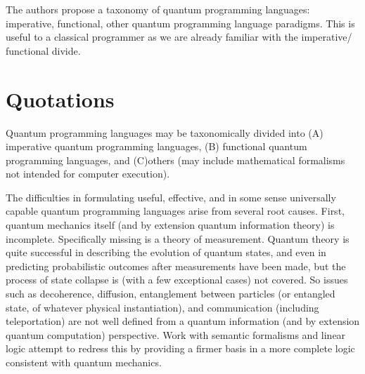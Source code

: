 \documentclass{article}
\begin{document}
The authors propose a taxonomy of quantum programming languages: imperative, functional, other quantum programming language paradigms. This is useful to a classical programmer as we are already familiar with the imperative/ functional divide.
\section{Quotations}

Quantum programming languages may be taxonomically divided into (A) imperative quantum programming languages, (B) functional quantum programming languages, and (C)others (may include mathematical formalisms not intended for computer execution).

The difficulties in formulating useful, effective, and in some sense universally capable quantum programming languages arise from several root causes. First, quantum mechanics itself (and by extension quantum information theory) is incomplete. Specifically missing is a theory of measurement. Quantum theory is quite successful in describing the evolution of quantum states, and even in predicting probabilistic outcomes after measurements have been made, but the process of state collapse is (with a few exceptional cases) not covered. So issues such as decoherence, diffusion, entanglement between particles (or entangled state, of whatever physical instantiation), and communication (including teleportation) are not well defined from a quantum information (and by extension quantum computation) perspective. Work with semantic formalisms and linear logic attempt to redress this by providing a firmer basis in a more complete logic consistent with quantum mechanics.
\end{document}
